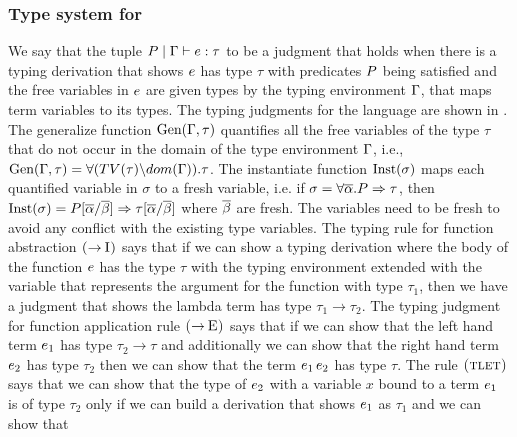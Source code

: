 \documentclass[format=sigplan,manuscript,review,screen,nonacm,margin=1in]{acmart}
\begin{document}
\subsubsection{Type system for \TCFD{}}
We say that the tuple $P \mid \Gamma \vdash e : \tau$ to be a judgment
that holds when there is a typing derivation that shows $e$ has type $\tau$
with predicates $P$ being satisfied and the free variables in $e$
are given types by the typing environment $\Gamma$, that maps term variables to its types.
The typing judgments for the language are shown in .
The generalize function $\text{Gen}(\Gamma, \tau)$ quantifies
all the free variables of the type $\tau$ that do not occur in the domain
of the type environment $\Gamma$, i.e., $\text{Gen}(\Gamma, \tau) = \forall(TV(\tau)\backslash dom(\Gamma)).\tau$.
The instantiate function $\text{Inst}(\sigma)$ maps each quantified variable in $\sigma$ to a
fresh variable, i.e. if $\sigma=\forall\overline{\alpha}.P\Rightarrow\tau$,
then $\text{Inst}(\sigma) = P[\overline{\alpha}/\overline{\beta}]\Rightarrow\tau[\overline{\alpha}/\overline{\beta}]$
where $\overline{\beta}$ are fresh. The variables need to be fresh to avoid
any conflict with the existing type variables. The typing rule
for function abstraction $\textsc{(\ensuremath{\mathord{\to}}\!~I)}$ says that if we can show a typing derivation
where the body of the function $e$ has the type $\tau$ with the typing environment
extended with the variable that represents the argument for the function with type $\tau_1$,
then we have a judgment that shows the lambda term
has type $\tau_1\to\tau_2$. The typing judgment for function application rule $\textsc{(\ensuremath{\mathord{\to}}\!~E)}$
says that if we can show that the left hand term $e_1$ has type $\tau_2 \to\tau$ and additionally we can
show that the right hand term $e_2$ has type $\tau_2$ then we can show
that the term $e_1\,e_2$ has type $\tau$. The rule $\textsc{(tlet)}$ says that we can show
that the type of $e_2$ with a variable $x$ bound to a term $e_1$ is of type $\tau_2$
only if we can build a derivation that shows $e_1$ as $\tau_1$ and we can show that
\end{document}
